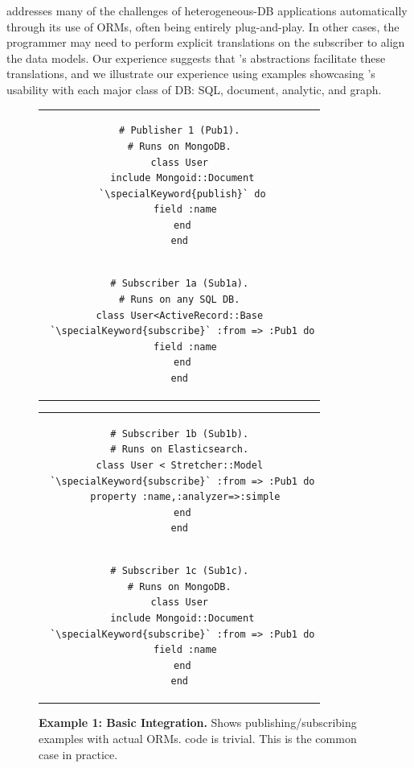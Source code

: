 \label{sec:examples}

\synapse addresses many of the challenges of heterogeneous-DB applications automatically through its use of ORMs, often being entirely plug-and-play.
In other cases, the programmer may need to perform explicit translations on the subscriber to align the data models.
Our experience suggests that \synapse's abstractions facilitate these translations, and we illustrate our experience using examples showcasing \synapse's usability with each major class of DB: SQL, document, analytic, and graph.

\begin{figure}[t]
\begin{tabular}{c}
\begin{minipage}{.22\textwidth}
\begin{lstlisting}[xleftmargin=1pt,framexleftmargin=1pt]
# Publisher 1 (Pub1).
# Runs on MongoDB.
class User
 include Mongoid::Document
 `\specialKeyword{publish}` do
  field :name
 end
end
\end{lstlisting}
\end{minipage}\vspace{-8pt}\\
\begin{minipage}{.22\textwidth}
\begin{lstlisting}[xleftmargin=1pt,framexleftmargin=1pt]
# Subscriber 1a (Sub1a).
# Runs on any SQL DB.
class User<ActiveRecord::Base
 `\specialKeyword{subscribe}` :from => :Pub1 do
  field :name
 end
end
\end{lstlisting}
\end{minipage}
\end{tabular}\hfill
\begin{tabular}{c}
\begin{minipage}{0.22\textwidth}
\begin{lstlisting}[xleftmargin=1pt,framexleftmargin=1pt]
# Subscriber 1b (Sub1b).
# Runs on Elasticsearch.
class User < Stretcher::Model
 `\specialKeyword{subscribe}` :from => :Pub1 do
  property :name,:analyzer=>:simple
 end
end
\end{lstlisting}
\end{minipage}\vspace{-8pt}\\
\begin{minipage}{0.22\textwidth}
\begin{lstlisting}[xleftmargin=1pt,framexleftmargin=1pt]
# Subscriber 1c (Sub1c).
# Runs on MongoDB.
class User
 include Mongoid::Document
 `\specialKeyword{subscribe}` :from => :Pub1 do
  field :name
 end
end
\end{lstlisting}
\end{minipage}
\end{tabular}
\vspace{-16pt}
\caption{{\bf Example 1: Basic Integration.}
Shows publishing/subscribing examples with actual ORMs.
\synapse code is trivial.  This is the common case in practice.
}
\label{fig:mongo-to-star}
\end{figure}

